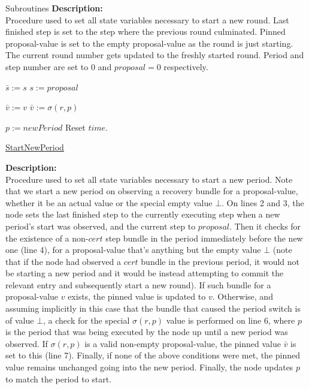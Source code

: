 \documentclass[10pt,a4paper]{article}
\begin{document}
\begin{section}{Subroutines}
\noindent \textbf{Description:}\\
Procedure used to set all state variables necessary to start a new round.
Last finished step is set to the step where the previous round culminated.
Pinned proposal-value is set to the empty proposal-value as the round is just starting.
The current round number gets updated to the freshly started round.
Period and step number are set to $0$ and $proposal=0$ respectively.


\begin{algorithm}[H]\label{algo:start-new-period}
    \begin{algorithmic}[1]

    \State $\bar{s} := s$
    \State $s := proposal$

        \State $\bar{v} := v$
        \State $\bar{v} := \sigma(r,p)$
    \EndIf

    \State $p := newPeriod$
    \State Reset $time$.
    \EndFunction
    \end{algorithmic}
    \caption{\underline{StartNewPeriod}}
\end{algorithm}

\noindent \textbf{Description:}\\
Procedure used to set all state variables necessary to start a new period.
Note that we start a new period on observing a recovery bundle for a proposal-value, whether it be
an actual value or the special empty value $\bot$.
On lines 2 and 3, the node sets the last finished step to the currently executing step when a new period's
start was observed, and the current step to $proposal$.
Then it checks for the existence of a non-$cert$ step bundle in the period immediately before the new one (line 4), 
for a proposal-value that's anything but the empty value $\bot$ (note that if the node had observed a $cert$
bundle in the previous period, it would not be starting a new period and it would be instead attempting to commit
the relevant entry and subsequently start a new round). If such bundle for a proposal-value $v$ exists, the pinned 
value is updated to $v$.
Otherwise, and assuming implicitly in this case that the bundle that caused the period switch is of value $\bot$,
a check for the special $\sigma(r,p)$ value is performed on line 6, where $p$ is the period that was being executed 
by the node up until a new period was observed. If $\sigma(r,p)$ is a valid non-empty proposal-value, the pinned 
value $\bar{v}$ is set to this (line 7).
Finally, if none of the above conditions were met, the pinned value remains unchanged going into the new period.
Finally, the node updates $p$ to match the period to start.


\end{section}
\end{document}
